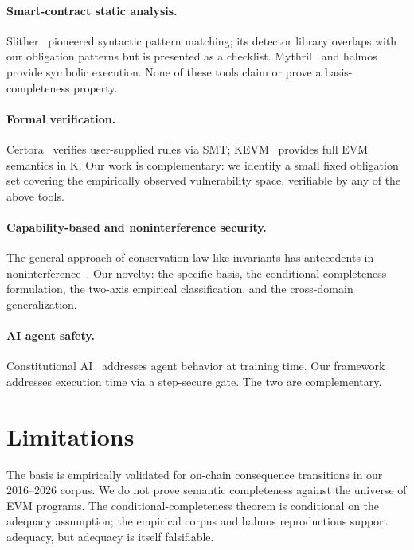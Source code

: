 \documentclass[11pt,a4paper]{article}
\begin{document}
\paragraph{Smart-contract static analysis.} Slither~\cite{slither} pioneered syntactic pattern matching; its detector library overlaps with our obligation patterns but is presented as a checklist. Mythril~\cite{mythril} and halmos~\cite{halmos} provide symbolic execution. None of these tools claim or prove a basis-completeness property.

\paragraph{Formal verification.} Certora~\cite{certora} verifies user-supplied rules via SMT; KEVM~\cite{kevm} provides full EVM semantics in K. Our work is complementary: we identify a small fixed obligation set covering the empirically observed vulnerability space, verifiable by any of the above tools.

\paragraph{Capability-based and noninterference security.} The general approach of conservation-law-like invariants has antecedents in noninterference~\cite{noninterference}. Our novelty: the specific basis, the conditional-completeness formulation, the two-axis empirical classification, and the cross-domain generalization.

\paragraph{AI agent safety.} Constitutional AI~\cite{ca} addresses agent behavior at training time. Our framework addresses execution time via a step-secure gate. The two are complementary.

\section{Limitations}\label{sec:limitations}

The basis is empirically validated for on-chain consequence transitions in our 2016--2026 corpus. We do not prove semantic completeness against the universe of EVM programs. The conditional-completeness theorem is conditional on the adequacy assumption; the empirical corpus and halmos reproductions support adequacy, but adequacy is itself falsifiable.
\end{document}
